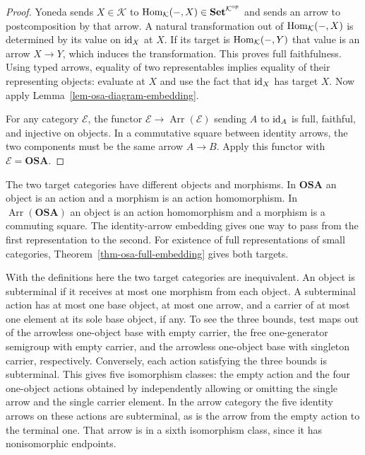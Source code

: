 \begin{proof}
Yoneda sends $X\in\mathcal K$ to
$\operatorname{Hom}_{\mathcal K}(-,X)\in\mathbf{Set}^{\mathcal K^{\mathrm{op}}}$ and
sends an arrow to postcomposition by that arrow. A natural
transformation out of $\operatorname{Hom}_{\mathcal K}(-,X)$ is determined by its value
on ${\operatorname{id}}_X$ at $X$. If its target is $\operatorname{Hom}_{\mathcal K}(-,Y)$ that value
is an arrow $X\to Y$, which induces the transformation. This proves
full faithfulness. Using typed arrows, equality of two representables
implies equality of their representing objects: evaluate at $X$ and
use the fact that ${\operatorname{id}}_X$ has target $X$. Now apply
Lemma~\ref{lem-osa-diagram-embedding}.

For any category $\mathcal E$, the functor
$\mathcal E\to\operatorname{Arr}(\mathcal E)$ sending $A$ to ${\operatorname{id}}_A$
is full, faithful, and injective on objects. In a commutative square
between identity arrows, the two components must be the same arrow
$A\to B$. Apply this functor with $\mathcal E=\mathbf{OSA}$.
\end{proof}

The two target categories have different objects and morphisms. In
$\mathbf{OSA}$ an object is an action and a morphism is an action
homomorphism. In $\operatorname{Arr}(\mathbf{OSA})$ an object is an action
homomorphism and a morphism is a commuting square. The identity-arrow
embedding gives one way to pass from the first representation to the
second. For existence of full representations of small categories,
Theorem~\ref{thm-osa-full-embedding} gives both targets.

With the definitions here the two target categories are inequivalent.
An object is subterminal if it receives at most one morphism from each
object. A subterminal action has at most one base object, at most one arrow,
and a carrier of at most one element at its sole base object, if any.
To see the three bounds, test maps out of the arrowless one-object base
with empty carrier, the free one-generator semigroup with empty carrier,
and the arrowless one-object base with singleton carrier, respectively.
Conversely, each action satisfying the three bounds is subterminal.
This gives five isomorphism classes: the empty action and the four
one-object actions obtained by independently allowing or omitting the
single arrow and the single carrier element. In the arrow category the
five identity arrows on these actions are subterminal, as is the arrow
from the empty action to the terminal one. That arrow is in a sixth
isomorphism class, since it has nonisomorphic endpoints.


